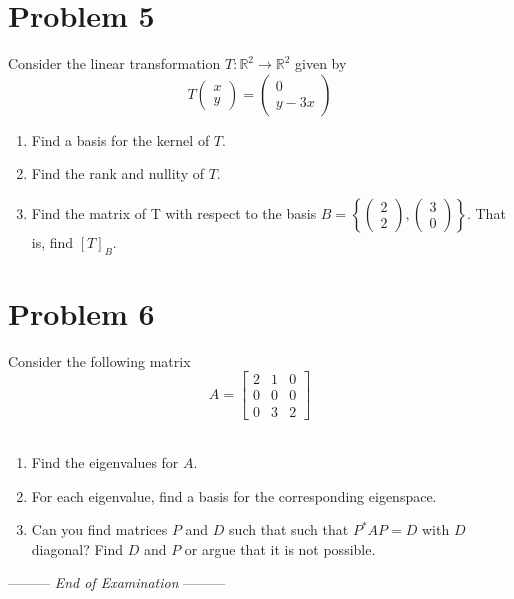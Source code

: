 \documentclass[a4paper,10pt]{article}
\newcommand{\lastwords}{End of Examination}
\def\R{\mathbb R}
\begin{document}
\section*{Problem 5}
Consider the linear transformation $T: \R^2 \rightarrow \R^2$ given by
$$
	T\left( \begin{array}{c} x \\ y \end{array} \right) = \left( \begin{array}{c} 0 \\ y-3x \end{array} \right)
$$
\begin{enumerate}
\item Find a basis for the kernel of $T$.
\item Find the rank and nullity of $T$.
\item Find the matrix of T with respect to the basis $B=\left\{ \left( \begin{array}{c} 2 \\ 2 \end{array} \right), \left( \begin{array}{c} 3 \\ 0 \end{array} \right)  \right\}$.
That is, find $[T]_{B}$.
\end{enumerate}

\section*{Problem 6}
Consider the following matrix
$$
A=\left[ \begin{array}{ccc} 2 & 1 & 0 \\ 0 & 0 & 0 \\ 0 & 3 & 2 \end{array} \right]
$$ \\
\begin{enumerate}
\item Find the eigenvalues for $A$.
\item For each eigenvalue, find a basis for the corresponding eigenspace.
\item Can you find matrices $P$ and $D$ such that such that $P^*AP=D$ with $D$ diagonal? Find $D$ and $P$ or argue that it is not possible.
\end{enumerate}


\begin{center}
\vspace{3cm}
--------- \textit{\lastwords} ---------
\end{center}


\label{finalpage}
\end{document}
